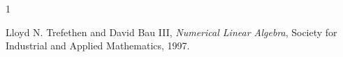 \documentclass[11pt,a4paper]{article}
\begin{document}
\begin{thebibliography}{1}

Lloyd N. Trefethen and David Bau III,
\newblock \emph{Numerical Linear Algebra},
\newblock Society for Industrial and Applied Mathematics, 1997.

\end{thebibliography}
\end{document}
